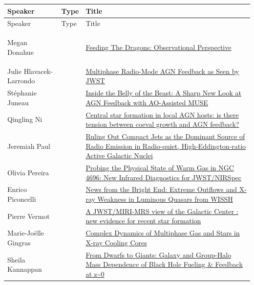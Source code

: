 {
\small
{}
\sloppy
\setlength{\emergencystretch}{1em}
\begin{longtable}{@{}>{\TableRaggedRight\arraybackslash\hspace{0pt}}p{} >{\centering\arraybackslash}p{} >{\TableRaggedRight\arraybackslash\hspace{0pt}}p{}@{}}
\toprule
Speaker & Type & Title \\
\midrule
\endfirsthead
\toprule
Speaker & Type & Title \\
\midrule
\endhead
\hypertarget{sched-4}{}Megan Donahue & \invitedbadge{} & \hyperlink{abs-4}{Feeding The Dragons: Observational Perspective} \\
\hypertarget{sched-33}{}Julie Hlavacek-Larrondo &  & \hyperlink{abs-33}{Multiphase Radio-Mode AGN Feedback as Seen by JWST} \\
\hypertarget{sched-34}{}Stéphanie Juneau &  & \hyperlink{abs-34}{Inside the Belly of the Beast: A Sharp New Look at AGN Feedback with AO-Assisted MUSE} \\
\hypertarget{sched-38}{}Qingling Ni &  & \hyperlink{abs-38}{Central star formation in local AGN hosts: is there tension between coeval growth and AGN feedback?} \\
\hypertarget{sched-40}{}Jeremiah Paul &  & \hyperlink{abs-40}{Ruling Out Compact Jets as the Dominant Source of Radio Emission in Radio-quiet, High-Eddington-ratio Active Galactic Nuclei} \\
\hypertarget{sched-41}{}Olivia Pereira &  & \hyperlink{abs-41}{Probing the Physical State of Warm Gas in NGC 4696: New Infrared Diagnostics for JWST/NIRSpec} \\
\hypertarget{sched-42}{}Enrico Piconcelli &  & \hyperlink{abs-42}{News from the Bright End: Extreme Outflows and X-ray Weakness in Luminous Quasars from WISSH} \\
\hypertarget{sched-49}{}Pierre Vermot &  & \hyperlink{abs-49}{A JWST/MIRI-MRS view of the Galactic Center : new evidence for recent star formation} \\
\hypertarget{sched-52}{}Marie-Joëlle Gingras &  & \hyperlink{abs-52}{Complex Dynamics of Multiphase Gas and Stars in X-ray Cooling Cores} \\
\hypertarget{sched-53}{}Sheila Kannappan &  & \hyperlink{abs-53}{From Dwarfs to Giants: Galaxy and Group-Halo Mass Dependence of Black Hole Fueling \& Feedback at z\textasciitilde{}0} \\
\bottomrule
\end{longtable}
}
\hypertarget{sched-wednesday-4}{}

